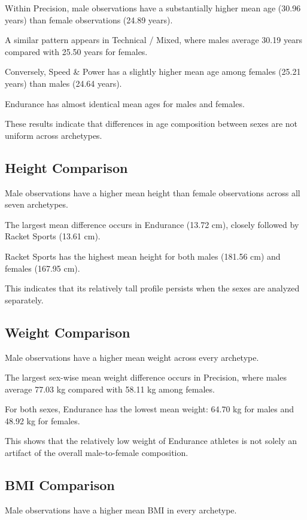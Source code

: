 \documentclass[11pt,a4paper]{article}
\begin{document}
Within Precision, male observations have a
substantially higher mean age (30.96 years)
than female observations (24.89 years).

A similar pattern appears in Technical / Mixed,
where males average 30.19 years compared with
25.50 years for females.

Conversely, Speed \& Power has a slightly higher
mean age among females (25.21 years) than males
(24.64 years).

Endurance has almost identical mean ages for
males and females.

These results indicate that differences in age
composition between sexes are not uniform
across archetypes.


\subsection{Height Comparison}

Male observations have a higher mean height
than female observations across all seven
archetypes.

The largest mean difference occurs in Endurance
(13.72 cm), closely followed by Racket Sports
(13.61 cm).

Racket Sports has the highest mean height for
both males (181.56 cm) and females (167.95 cm).

This indicates that its relatively tall profile
persists when the sexes are analyzed separately.


\subsection{Weight Comparison}

Male observations have a higher mean weight
across every archetype.

The largest sex-wise mean weight difference
occurs in Precision, where males average
77.03 kg compared with 58.11 kg among females.

For both sexes, Endurance has the lowest
mean weight: 64.70 kg for males and 48.92 kg
for females.

This shows that the relatively low weight
of Endurance athletes is not solely an
artifact of the overall male-to-female
composition.


\subsection{BMI Comparison}

Male observations have a higher mean BMI
in every archetype.
\end{document}
